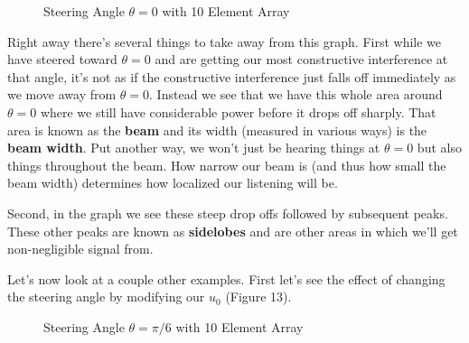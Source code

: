 \documentclass[10pt,a4paper]{article}
\begin{document}
\begin{figure}[!htb]
\caption{\label{fig:my-label} Steering Angle $\theta=0$ with 10 Element Array}
\end{figure}

Right away there's several things to take away from this graph. First while we have steered toward $\theta=0$ and are getting our most constructive interference at that angle, it's not as if the constructive interference just falls off immediately as we move away from $\theta=0$. Instead we see that we have this whole area around $\theta=0$ where we still have considerable power before it drops off sharply. That area is known as the \textbf{beam} and its width (measured in various ways) is the \textbf{beam width}. Put another way, we won't just be hearing things at $\theta=0$ but also things throughout the beam. How narrow our beam is (and thus how small the beam width) determines how localized our listening will be. 

Second, in the graph we see these steep drop offs followed by subsequent peaks. These other peaks are known as \textbf{sidelobes} and are other areas in which we'll get non-negligible signal from. 

Let's now look at a couple other examples. First let's see the effect of changing the steering angle by modifying our $u_0$ (Figure 13). 

\begin{figure}[!htb]
\caption{\label{fig:my-label} Steering Angle $\theta=\pi/6$ with 10 Element Array}
\end{figure}
\end{document}
